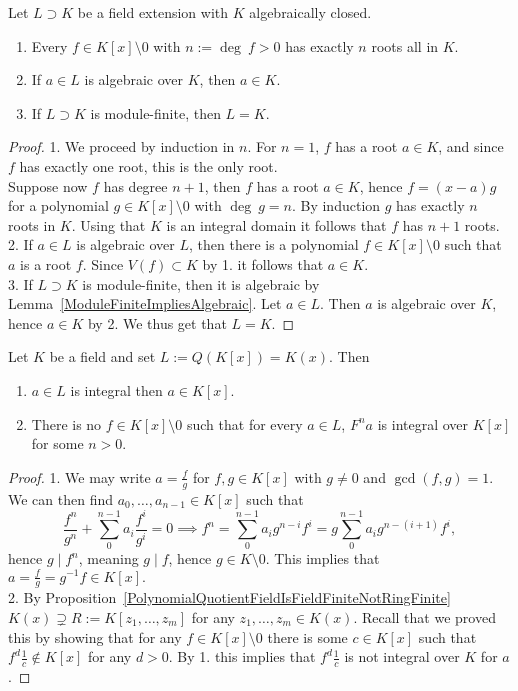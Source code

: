 \begin{lemma}\label{TechnicalLemmaAboutFieldExtOverAlgClosedFields}
    Let $L\supset K$ be a field extension with $K$ algebraically closed. 
    \begin{enumerate}
        \item Every $f\in K[x]\setminus 0$ with $n:=\deg \ f >0$ has exactly $n$ roots all in $K$.  
        \item If $a\in L$ is algebraic over $K$, then $a\in K$.
        \item If $L\supset K$ is module-finite, then $L=K$.
    \end{enumerate}
\end{lemma}
\begin{proof}
    1. We proceed by induction in $n$. For $n=1$, $f$ has a root $a\in K$, and since $f$ has exactly one root, this is the only root.\\ 
    Suppose now $f$ has degree $n+1$, then $f$ has a root $a\in K$, hence $f = (x-a)g$ for a polynomial $g\in K[x]\setminus0$ with $\deg \ g = n$. By induction $g$ has exactly $n$ roots in $K$. Using that $K$ is an integral domain it follows that $f$ has $n+1$ roots.\\
    2. If $a\in L$ is algebraic over $L$, then there is a polynomial $f\in K[x]\setminus 0$ such that $a$ is a root $f$. Since $V(f)\subset K$ by 1. it follows that $a\in K$.\\
    3. If $L\supset K$ is module-finite, then it is algebraic by Lemma~\ref{ModuleFiniteImpliesAlgebraic}. Let $a\in L$. Then $a$ is algebraic over $K$, hence $a\in K$ by 2. We thus get that $L=K$.
\end{proof}
\begin{lemma}\label{TechnicalPolynomialFieldExtensionLemma}
    Let $K$ be a field and set $L:= Q(K[x])=K(x)$. Then
    \begin{enumerate}
        \item $a\in L$ is integral then $a\in K[x]$.
        \item There is no $f\in K[x]\setminus 0$ such that for every $a\in L $, $F^na$ is integral over $K[x]$ for some $n>0$. 
    \end{enumerate}
\end{lemma}
\begin{proof}
    1. We may write $a = \frac{f}{g}$ for $f,g\in K[x]$ with $g\neq 0$ and $\gcd(f,g)=1$. We can then find $a_0,\dots,a_{n-1}\in K[x]$ such that 
    $$\frac{f^n}{g^n}+\sum_0^{n-1} a_i\frac{f^i}{g^i} = 0 \implies f^n = \sum_0^{n-1} a_ig^{n-i}f^i = g\sum_0^{n-1} a_ig^{n-(i+1)}f^i,$$
    hence $g\mid f^n$, meaning $g\mid f$, hence $g\in K\setminus 0$. This implies that $a = \frac{f}{g} = g^{-1}f\in K[x].$\\
    2. By Proposition~\ref{PolynomialQuotientFieldIsFieldFiniteNotRingFinite} $K(x)\supsetneq R:=K[z_1,\dots,z_m]$ for any $z_1,\dots,z_m\in K(x)$. Recall that we proved this by showing that for any $f\in K[x]\setminus 0$ there is some $c\in K[x]$ such that $f^d\frac{1}{c}\notin K[x]$ for any $d>0$. By 1. this implies that $f^d\frac{1}{c}$ is not integral over $K$ for $a$.
\end{proof}
